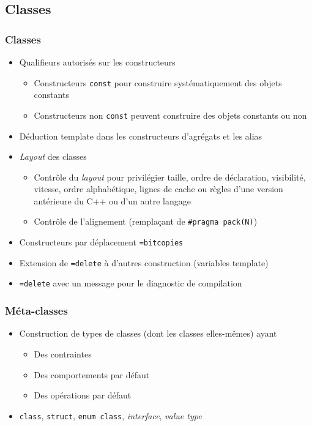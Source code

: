 \documentclass[C++.tex]{subfiles}
\begin{document}
\subsection*{Classes}
\begin{frame}[fragile]
	\frametitle{Classes}
	\begin{itemize}
		\item Qualifieurs autorisés sur les constructeurs
		\begin{itemize}
			\item Constructeurs \lstinline|const| pour construire systématiquement des objets constants
			\item Constructeurs non \lstinline|const| peuvent construire des objets constants ou non
		\end{itemize}
		\item Déduction template dans les constructeurs d'agrégats et les alias
		\item \textit{Layout} des classes
		\begin{itemize}
			\item Contrôle du \textit{layout} pour privilégier taille, ordre de déclaration, visibilité, vitesse, ordre alphabétique, lignes de cache ou règles d'une version antérieure du C++ ou d'un autre langage
			\item Contrôle de l'alignement (remplaçant de \lstinline|#pragma pack(N)|)
		\end{itemize}
		\item Constructeurs par déplacement \lstinline|=bitcopies|
		\item Extension de \lstinline|=delete| à d'autres construction (variables template)
		\item \lstinline|=delete| avec un message pour le diagnostic de compilation
	\end{itemize}
\end{frame}

\begin{frame}[fragile]
	\frametitle{Méta-classes}
	\begin{itemize}
		\item Construction de types de classes (dont les classes elles-mêmes) ayant
		\begin{itemize}
			\item Des contraintes
			\item Des comportements par défaut
			\item Des opérations par défaut
		\end{itemize}
		\item \lstinline|class|, \lstinline|struct|, \lstinline|enum class|, \textit{interface}, \textit{value type}
	\end{itemize}
\end{frame}
\end{document}
